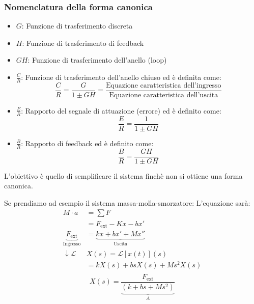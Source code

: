 \documentclass[a4paper]{article}
\begin{document}
\subsubsection{Nomenclatura della forma canonica}
\label{25-11-D12}
\begin{itemize}
  \item \( G \): Funzione di trasferimento discreta
  \item \( H \): Funzione di trasferimento di feedback
  \item \( GH \): Funzione di trasferimento dell'anello (loop)
  \item \( \frac{C}{R} \): Funzione di trasferimento dell'anello chiuso ed è definita come:
    \[
    \frac{C}{R} = \frac{G}{1 \pm GH} = \frac{\text{Equazione caratteristica dell'ingresso}}
    {\text{Equazione caratteristica dell'uscita}}
    \] 

  \item \( \frac{E}{R} \): Rapporto del segnale di attuazione (errore) ed è definito come:
    \[
    \frac{E}{R} = \frac{1}{1 \pm GH}
    \]

  \item \( \frac{B}{R} \): Rapporto di feedback ed è definito come:
    \[
    \frac{B}{R} = \frac{GH}{1 \pm GH}
    \]
\end{itemize}
L'obiettivo è quello di semplificare il sistema finchè non si ottiene una forma canonica.

\begin{example}
  Se prendiamo ad esempio il sistema massa-molla-smorzatore:
  \label{25-11-D13}
  \noindent
  L'equazione sarà:
  \[
    \begin{aligned}
      M \cdot a &= \sum F\\
                &= F_{\text{ext}} - Kx - bx'\\
      \underbrace{F_{\text{ext}}}_{\text{Ingresso}} &= \underbrace{kx + bx'+Mx''}_
                {\text{Uscita}}\\
      \downarrow \mathcal{L} & X(s) = \mathcal{L}\left[ x(t) \right](s) \\
                             &= k X(s) +bs X(s)+ M s^2 X(s)\\
    \end{aligned}
  \] 
  \[
    X(s) = \frac{F_{\text{ext}}}{\underbrace{\left( k + bs + Ms^2 \right)}_{A}}
  \] 
  \label{25-11-D14}
\end{example}
\end{document}
